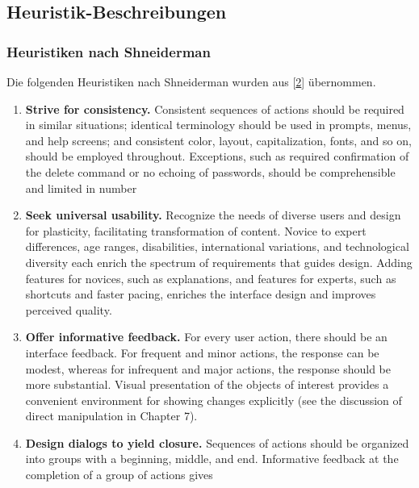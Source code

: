\documentclass[
  12pt,
  ngerman,
  a4paper,
]{article}
\begin{document}
\hypertarget{sec:heuristik-beschreibungen}{%
\subsection{Heuristik-Beschreibungen}\label{sec:heuristik-beschreibungen}}

\hypertarget{sec:heuristiken-shneiderman}{%
\subsubsection{Heuristiken nach
Shneiderman}\label{sec:heuristiken-shneiderman}}

Die folgenden Heuristiken nach Shneiderman wurden aus
{[}\protect\hyperlink{ref-heur:shneiderman}{2}{]} übernommen.

\begin{enumerate}
\def\labelenumi{\arabic{enumi}.}
\item
  \textbf{Strive for consistency.} Consistent sequences of actions
  should be required in similar situations; identical terminology should
  be used in prompts, menus, and help screens; and consistent color,
  layout, capitalization, fonts, and so on, should be employed
  throughout. Exceptions, such as required confirmation of the delete
  command or no echoing of passwords, should be comprehensible and
  limited in number
\item
  \textbf{Seek universal usability.} Recognize the needs of diverse
  users and design for plasticity, facilitating transformation of
  content. Novice to expert differences, age ranges, disabilities,
  international variations, and technological diversity each enrich the
  spectrum of requirements that guides design. Adding features for
  novices, such as explanations, and features for experts, such as
  shortcuts and faster pacing, enriches the interface design and
  improves perceived quality.
\item
  \textbf{Offer informative feedback.} For every user action, there
  should be an interface feedback. For frequent and minor actions, the
  response can be modest, whereas for infrequent and major actions, the
  response should be more substantial. Visual presentation of the
  objects of interest provides a convenient environment for showing
  changes explicitly (see the discussion of direct manipulation in
  Chapter 7).
\item
  \textbf{Design dialogs to yield closure.} Sequences of actions should
  be organized into groups with a beginning, middle, and end.
  Informative feedback at the completion of a group of actions gives

\end{enumerate}
\end{document}
